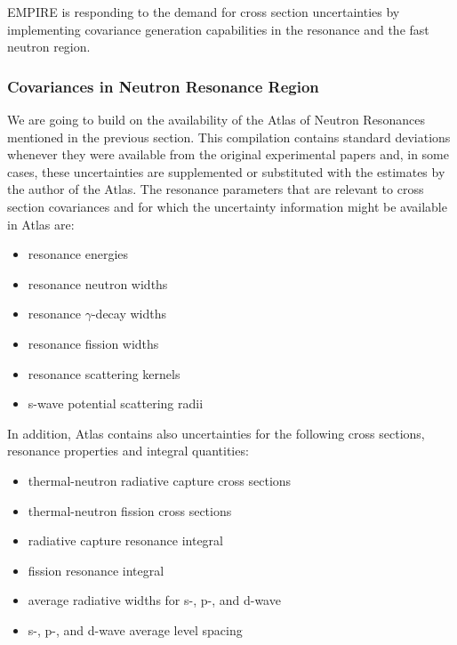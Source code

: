 EMPIRE is responding to the demand for cross section uncertainties by
implementing covariance generation capabilities in the resonance and the
fast neutron region.

\subsubsection{Covariances in Neutron Resonance Region}

We are going to build on the availability of the Atlas of Neutron Resonances~%
\cite{Mughabghab:06} mentioned in the previous section. This compilation
contains standard deviations whenever they were available from the original
experimental papers and, in some cases, these uncertainties are supplemented
or substituted with the estimates by the author of the Atlas. The resonance
parameters that are relevant to cross section covariances and for which the
uncertainty information might be available in Atlas are:

\begin{itemize}
\item resonance energies

\item resonance neutron widths

\item resonance $\gamma$-decay widths

\item resonance fission widths

\item resonance scattering kernels

\item s-wave potential scattering radii
\end{itemize}

In addition, Atlas contains also uncertainties for the following cross
sections, resonance properties and integral quantities:

\begin{itemize}
\item thermal-neutron radiative capture cross sections

\item thermal-neutron fission cross sections

\item radiative capture resonance integral

\item fission resonance integral

\item average radiative widths for s-, p-, and d-wave

\item s-, p-, and d-wave average level spacing
\end{itemize}

